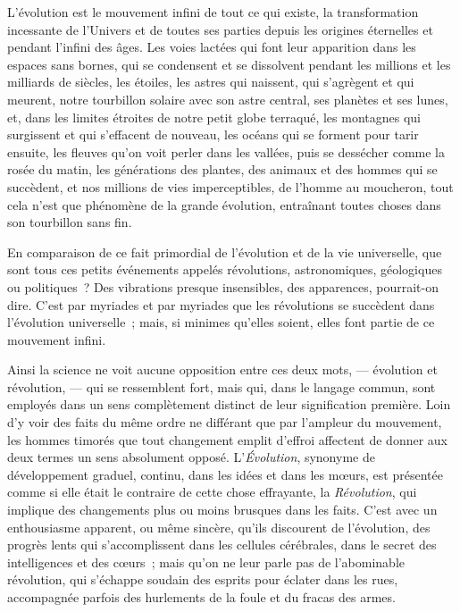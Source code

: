 \documentclass[french,twoside]{book} %
\newcommand\chaptercont{} %
\begin{document}
\chaptercont
\noindent L’évolution est le mouvement infini de tout ce qui existe, la transformation incessante de l’Univers et de toutes ses parties depuis les origines éternelles et pendant l’infini des âges. Les voies lactées qui font leur apparition dans les espaces sans bornes, qui se condensent et se dissolvent pendant les millions et  les milliards de siècles, les étoiles, les astres qui naissent, qui s’agrègent et qui meurent, notre tourbillon solaire avec son astre central, ses planètes et ses lunes, et, dans les limites étroites de notre petit globe terraqué, les montagnes qui surgissent et qui s’effacent de nouveau, les océans qui se forment pour tarir ensuite, les fleuves qu’on voit perler dans les vallées, puis se dessécher comme la rosée du matin, les générations des plantes, des animaux et des hommes qui se succèdent, et nos millions de vies imperceptibles, de l’homme au moucheron, tout cela n’est que phénomène de la grande évolution, entraînant toutes choses dans son tourbillon sans fin.\par
En comparaison de ce fait primordial  de l’évolution et de la vie universelle, que sont tous ces petits événements appelés révolutions, astronomiques, géologiques ou politiques ? Des vibrations presque insensibles, des apparences, pourrait-on dire. C’est par myriades et par myriades que les révolutions se succèdent dans l’évolution universelle ; mais, si minimes qu’elles soient, elles font partie de ce mouvement infini.\par
Ainsi la science ne voit aucune opposition entre ces deux mots, — évolution et révolution, — qui se ressemblent fort, mais qui, dans le langage commun, sont employés dans un sens complètement distinct de leur signification première. Loin d’y voir des faits du même ordre ne différant que par l’ampleur du mouvement, les hommes timorés que tout  changement emplit d’effroi affectent de donner aux deux termes un sens absolument opposé. L’\emph{Évolution}, synonyme de développement graduel, continu, dans les idées et dans les mœurs, est présentée comme si elle était le contraire de cette chose effrayante, la \emph{Révolution}, qui implique des changements plus ou moins brusques dans les faits. C’est avec un enthousiasme apparent, ou même sincère, qu’ils discourent de l’évolution, des progrès lents qui s’accomplissent dans les cellules cérébrales, dans le secret des intelligences et des cœurs ; mais qu’on ne leur parle pas de l’abominable révolution, qui s’échappe soudain des esprits pour éclater dans les rues, accompagnée parfois des hurlements de la foule et du fracas des armes.\par
\end{document}
